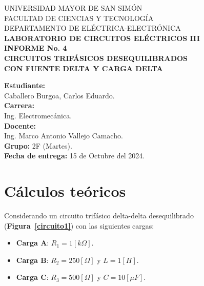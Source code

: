 \documentclass[letter,11pt]{article}
\begin{document}
\begin{titlepage}
    \begin{center}
        {\Large UNIVERSIDAD MAYOR DE SAN SIMÓN}\\
        \vspace*{0.15cm}
        {\large FACULTAD DE CIENCIAS Y TECNOLOGÍA}\\
        \vspace*{0.10cm}
        DEPARTAMENTO DE ELÉCTRICA-ELECTRÓNICA\\
        \vspace*{3.0cm}
        {\Large \textbf{LABORATORIO DE CIRCUITOS ELÉCTRICOS III}}\\
        \vspace*{0.3cm}
        {\Large \textbf{INFORME No. 4}}\\
        \vspace*{3.5cm}
        {\Large \textbf{CIRCUITOS TRIFÁSICOS DESEQUILIBRADOS \\
        CON FUENTE DELTA Y CARGA DELTA}}\\
    \end{center}

    \vspace*{5.8cm}
    \leftskip=7.95cm
    \noindent
    \textbf{Estudiante:}\\
    Caballero Burgoa, Carlos Eduardo.\\
    \newline
    \textbf{Carrera:}\\
    Ing. Electromecánica.\\
    \newline
    \textbf{Docente:}\\
    Ing. Marco Antonio Vallejo Camacho.\\
    \newline
    \textbf{Grupo:} 2F (Martes).\\
\textbf{Fecha de entrega:} 15 de Octubre del 2024.\\
\end{titlepage}

\section{Cálculos teóricos}
Considerando un circuito trifásico delta-delta desequilibrado
(\textbf{Figura~\ref{circuito1}}) con las siguientes cargas:

\begin{itemize}
    \item \textbf{Carga A}: $R_1=1[k\Omega]$.
    \item \textbf{Carga B}: $R_2=250[\Omega]$ y $L=1[H]$.
    \item \textbf{Carga C}: $R_3=500[\Omega]$ y $C=10[\mu F]$.
\end{itemize}
\end{document}
